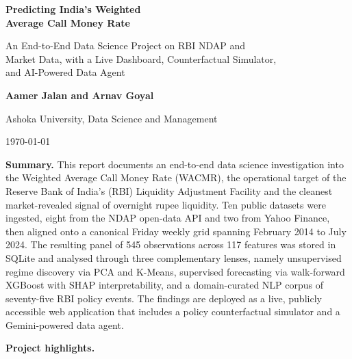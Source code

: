 \begin{titlepage}
\thispagestyle{empty}
\vspace*{1.4cm}

{\Huge\bfseries\color{Slate} Predicting India's Weighted\\Average Call Money Rate\par}
\vspace{0.45em}
{\Large\color{Slate} An End-to-End Data Science Project on RBI NDAP and\\Market Data, with a Live Dashboard, Counterfactual Simulator,\\and AI-Powered Data Agent\par}

\vspace{1.0em}
{\large\bfseries Aamer Jalan and Arnav Goyal\par}
{\large Ashoka University, Data Science and Management\par}
{\normalsize \today\par}

\vspace{1.2em}
\noindent\textbf{\color{Slate}Summary.}
This report documents an end-to-end data science investigation into the
Weighted Average Call Money Rate (WACMR), the operational target of the
Reserve Bank of India's (RBI) Liquidity Adjustment Facility and the
cleanest market-revealed signal of overnight rupee liquidity. Ten
public datasets were ingested, eight from the NDAP open-data API and
two from Yahoo Finance, then aligned onto a canonical Friday weekly
grid spanning February 2014 to July 2024. The resulting panel of 545
observations across 117 features was stored in SQLite and analysed
through three complementary lenses, namely unsupervised regime
discovery via PCA and K-Means, supervised forecasting via walk-forward
XGBoost with SHAP interpretability, and a domain-curated NLP corpus of
seventy-five RBI policy events. The findings are deployed as a live,
publicly accessible web application that includes a policy
counterfactual simulator and a Gemini-powered data agent.

\vspace{0.6em}
\noindent\textbf{\color{Slate}Project highlights.}
\begin{center}
\hfill
{}\hfill
{}\hfill
{}\hfill
{}
\end{center}


\end{titlepage}
